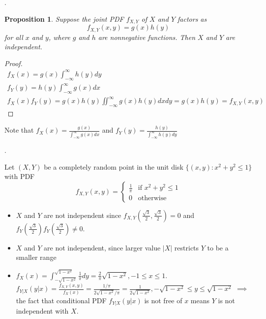 \documentclass[8pt]{beamer}
\newtheorem{proposition}[theorem]{Proposition}
\newcommand{\abs}[1]{\left\lvert #1 \right\rvert}
\begin{document}
\begin{frame}{.}
    \begin{proposition}
        Suppose the joint PDF $f_{X,Y}$ of $X$ and $Y$ factors as 
        \[
        f_{X,Y}(x,y) = g(x) h(y)
        \]
        for all $x$ and $y$, where $g$ and $h$ are nonnegative functions.
        Then $X$ and $Y$ are independent.
    \end{proposition}
    \begin{proof}
        \[
    \begin{gathered}
        f_X(x) = g(x) \int_{-\infty}^\infty h(y) dy \\
        f_Y(y) = h(y) \int_{-\infty}^\infty g(x) dx \\
        f_X(x) f_Y(y) = g(x) h(y) \iint_{-\infty}^\infty g(x) h(y) dx dy = g(x) h(y) = f_{X,Y} (x,y)
    \end{gathered}
    \]
    \end{proof} 

    Note that $f_X(x) = \frac{g(x)}{\int_{-\infty}^\infty g(x)dx}$ and $f_Y(y) = \frac{h(y)}{\int_{-\infty}^\infty h(y) dy}$

\end{frame}

\begin{frame}{.}
    \begin{example}
    Let $(X,Y)$ be a completely random point in the unit disk $\{(x,y): x^2 + y^2 \leq 1\}$ with PDF 
    \[
    f_{X,Y}(x,y) =
    \begin{cases}
        \frac{1}{\pi}  & \text{if } x^2 + y^2 \leq 1\\
        0 & \text{otherwise}
    \end{cases}
    \]
    \begin{itemize}
        \item $X$ and $Y$ are not independent since $f_{X,Y}(\frac{\sqrt{3}}{2}, \frac{\sqrt{3}}{2}) = 0$ and $f_Y(\frac{\sqrt{3}}{2})f_Y(\frac{\sqrt{3}}{2})\neq 0$.
        \item $X$ and $Y$ are not independent, since larger value $\abs{X}$ restricts $Y$ to be a smaller range
        \item $f_X(x) = \int_{-\sqrt{1 - x^2}}^{\sqrt{1 - x^2}}\frac{1}{\pi} dy= \frac{2}{\pi} \sqrt{1 - x^2}, -1 \leq x \leq 1$. $f_{Y|X}(y|x) = \frac{f_{X,Y}(x,y)}{f_X(x)} = \frac{1/\pi}{2\sqrt{1 - x^2} /\pi} = \frac{1}{2\sqrt{1 - x^2}}, -\sqrt{1 - x^2} \leq y \leq \sqrt{1 - x^2}$ $\implies$ the fact that conditional PDF $f_{Y|X}(y|x)$ is not free of $x$ means $Y$ is not independent with $X$.
    \end{itemize}
    \end{example}
\end{frame}
\end{document}
